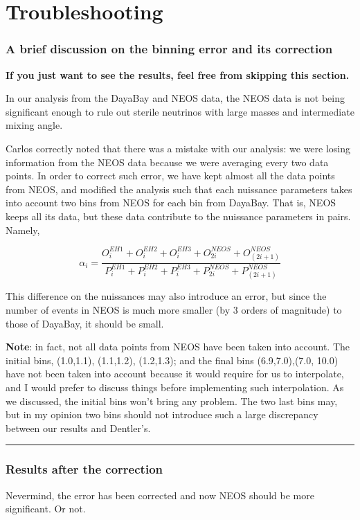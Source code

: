 \documentclass[a4paper, 10 pt]{article}
\begin{document}
\section*{Troubleshooting}


\subsubsection*{A brief discussion on the binning error and its correction}
\textbf{If you just want to see the results, feel free from skipping this section.}

In our analysis from the DayaBay and NEOS data, the NEOS data is not being significant enough to rule out sterile neutrinos with large masses and intermediate mixing angle.

Carlos correctly noted that there was a mistake with our analysis: we were losing information from the NEOS data because we were averaging every two data points. In order to correct such error, we have kept almost all the data points from NEOS, and modified the analysis such that each nuissance parameters takes into account two bins from NEOS for each bin from DayaBay. That is, NEOS keeps all its data, but these data contribute to the nuissance parameters in pairs. Namely,

\[
\alpha_i = 
\frac{O^{EH1}_i + O^{EH2}_i + O^{EH3}_i + O^{NEOS}_{2i} + O^{NEOS}_{(2i+1)}}{  
P^{EH1}_i + P^{EH2}_i + P^{EH3}_i + P^{NEOS}_{2i} + P^{NEOS}_{(2i+1)}}
\]

This difference on the nuissances may also introduce an error, but since the number of events in NEOS is much more smaller (by 3 orders of magnitude) to those of DayaBay, it should be small.


\textbf{Note}: in fact, not all data points from NEOS have been taken into account. The initial bins, (1.0,1.1), (1.1,1.2), (1.2,1.3); and the final bins (6.9,7.0),(7.0, 10.0) have not been taken into account because it would require for us to interpolate, and I would prefer to discuss things before implementing such interpolation. As we discussed, the initial bins won't bring any problem. The two last bins may, but in my opinion two bins should not introduce such a large discrepancy between our results and Dentler's.

\vspace{0.5cm}
\hrule

\subsubsection*{Results after the correction}
Nevermind, the error has been corrected and now NEOS should be more significant. Or not.
\end{document}
